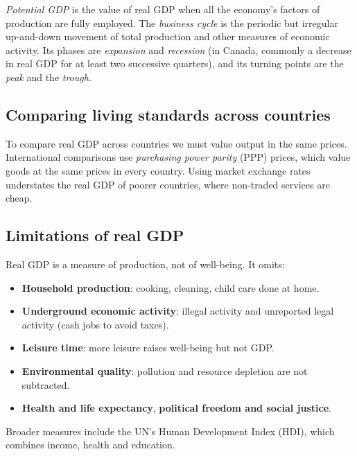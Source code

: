 \begin{definition}
\emph{Potential GDP} is the value of real GDP when all the economy's factors of
production are fully employed. The \emph{business cycle} is the periodic but irregular
up-and-down movement of total production and other measures of economic activity. Its
phases are \emph{expansion} and \emph{recession} (in Canada, commonly a decrease in real
GDP for at least two successive quarters), and its turning points are the \emph{peak} and
the \emph{trough}.
\end{definition}

\begin{center}
\end{center}

\subsection{Comparing living standards across countries}

To compare real GDP across countries we must value output in the same prices.
International comparisons use \emph{purchasing power parity} (PPP) prices, which value
goods at the same prices in every country. Using market exchange rates understates the
real GDP of poorer countries, where non-traded services are cheap.

\subsection{Limitations of real GDP}

Real GDP is a measure of production, not of well-being. It omits:
\begin{itemize}
  \item \textbf{Household production}: cooking, cleaning, child care done at home.
  \item \textbf{Underground economic activity}: illegal activity and unreported legal
        activity (cash jobs to avoid taxes).
  \item \textbf{Leisure time}: more leisure raises well-being but not GDP.
  \item \textbf{Environmental quality}: pollution and resource depletion are not
        subtracted.
  \item \textbf{Health and life expectancy}, \textbf{political freedom and social
        justice}.
\end{itemize}
Broader measures include the UN's Human Development Index (HDI), which combines income,
health and education.

